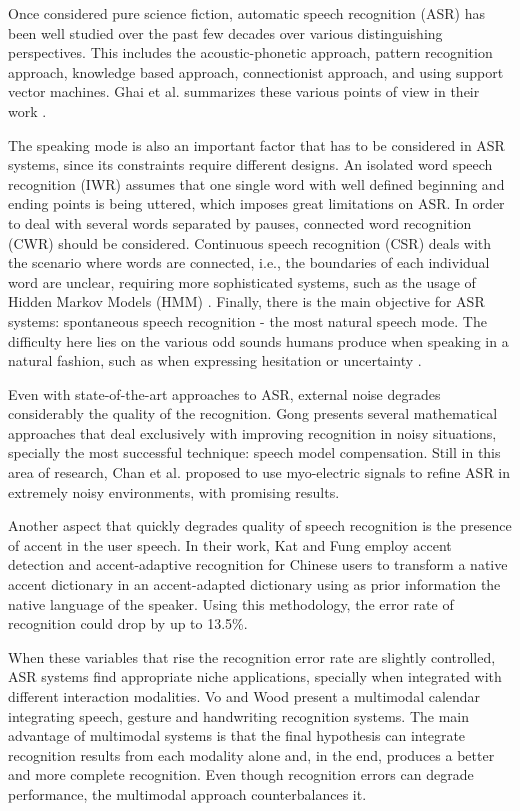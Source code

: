 \documentclass[]{article}
\begin{document}
Once considered pure science fiction, automatic speech recognition (ASR) has been well studied over the past few decades
over various distinguishing perspectives. This includes the acoustic-phonetic approach, pattern recognition approach, knowledge
based approach, connectionist approach, and using support vector machines. Ghai et al. summarizes these various points of view
in their work \cite{GhaiSingh}.


The speaking mode is also an important factor that has to be considered in ASR systems, since its constraints require
different designs. An isolated word speech recognition (IWR) assumes that one single word with well defined beginning
and ending points is being uttered, which imposes great limitations on ASR. In order to deal with several words
separated by pauses, connected word recognition (CWR) should be considered. Continuous speech recognition (CSR) deals
with the scenario where words are connected, i.e., the boundaries of each individual word are unclear, requiring more
sophisticated systems, such as the usage of Hidden Markov Models (HMM) \cite{Young2001}. Finally, there is the main
objective for ASR systems: spontaneous speech recognition - the most natural speech mode. The difficulty here lies on
the various odd sounds humans produce when speaking in a natural fashion, such as when expressing hesitation or
uncertainty \cite{GhaiSingh}.


Even with state-of-the-art approaches to ASR, external noise degrades considerably the quality of the recognition. Gong
\cite{Gong1995261} presents several mathematical approaches that deal exclusively with improving recognition in noisy
situations, specially the most successful technique: speech model compensation. Still in this area of research, Chan et
al. \cite{Chan2001} proposed to use myo-electric signals to refine ASR in extremely noisy environments, with promising
results.


Another aspect that quickly degrades quality of speech recognition is the presence of accent in the user speech. In their work,
Kat and Fung \cite{KatFung758102} employ accent detection and accent-adaptive recognition for Chinese users to transform a native
accent dictionary in an accent-adapted dictionary using as prior information the native language of the speaker. Using this
methodology, the error rate of recognition could drop by up to 13.5\%.


When these variables that rise the recognition error rate are slightly controlled, ASR systems find appropriate niche
applications, specially when integrated with different interaction modalities. Vo and Wood \cite{VoWood550794} present a
multimodal calendar integrating speech, gesture and handwriting recognition systems. The main advantage of multimodal
systems is that the final hypothesis can integrate recognition results from each modality alone and, in the end,
produces a better and more complete recognition. Even though recognition errors can degrade performance, the multimodal
approach counterbalances it.
\end{document}
